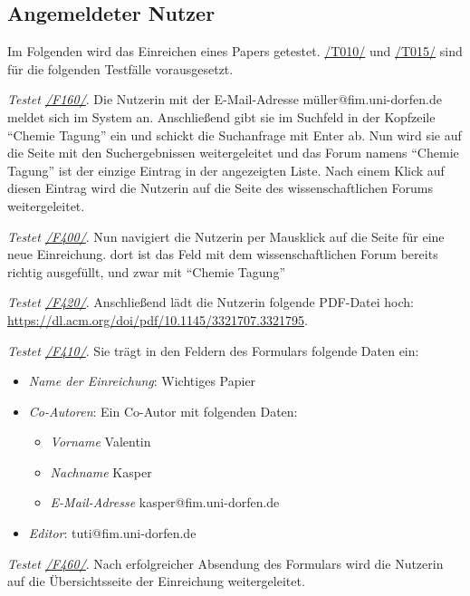 \subsection{Angemeldeter Nutzer}
Im Folgenden wird das Einreichen eines Papers getestet. \hyperref[t010]{/T010/} und \hyperref[t015]{/T015/} sind für die folgenden Testfälle vorausgesetzt.
\begin{description}

	 \emph{Testet \hyperref[funkt:160]{/F160/}}.
	Die Nutzerin mit der E-Mail-Adresse müller@fim.uni-dorfen.de meldet sich im System an.
	Anschließend gibt sie im Suchfeld in der Kopfzeile ``Chemie Tagung'' ein und schickt die Suchanfrage mit Enter ab.
	Nun wird sie auf die Seite mit den Suchergebnissen weitergeleitet und das Forum namens ``Chemie Tagung'' ist der einzige Eintrag in der angezeigten Liste.
	Nach einem Klick auf diesen Eintrag wird die Nutzerin auf die Seite des wissenschaftlichen Forums weitergeleitet.

	 \emph{Testet \hyperref[funkt:400]{/F400/}}.
	Nun navigiert die Nutzerin per Mausklick auf die Seite für eine neue Einreichung.
	dort ist das Feld mit dem wissenschaftlichen Forum bereits richtig ausgefüllt, und zwar mit ``Chemie Tagung''

	 \emph{Testet \hyperref[funkt:420]{/F420/}}.
	Anschließend lädt die Nutzerin folgende PDF-Datei hoch: \href{https://dl.acm.org/doi/pdf/10.1145/3321707.3321795}{https://dl.acm.org/doi/pdf/10.1145/3321707.3321795}.
	
	 \emph{Testet \hyperref[funkt:410]{/F410/}}.
	Sie trägt in den Feldern des Formulars folgende Daten ein:
	\begin{itemize}
		\item \emph{Name der Einreichung}: Wichtiges Papier
		\item \emph{Co-Autoren}: Ein Co-Autor mit folgenden Daten:
		\begin{itemize}
			\item \emph{Vorname} Valentin
			\item \emph{Nachname} Kasper
			\item \emph{E-Mail-Adresse} kasper@fim.uni-dorfen.de
		\end{itemize}
		\item \emph{Editor}: tuti@fim.uni-dorfen.de
	\end{itemize}


	 \emph{Testet \hyperref[funkt:460]{/F460/}}.
	Nach erfolgreicher Absendung des Formulars wird die Nutzerin auf die Übersichtsseite der Einreichung weitergeleitet.


\end{description}

